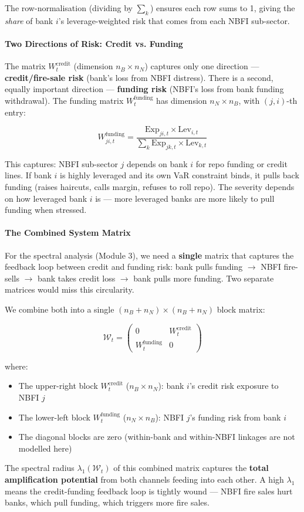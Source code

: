 \documentclass[11pt,a4paper]{article}
\begin{document}
The row-normalisation (dividing by $\sum_k$) ensures each row sums to 1, giving the \textit{share} of bank $i$'s leverage-weighted risk that comes from each NBFI sub-sector.


\paragraph{Two Directions of Risk: Credit vs. Funding}

The matrix $W_t^{\text{credit}}$ (dimension $n_B \times n_N$) captures only one direction --- \textbf{credit/fire-sale risk} (bank's loss from NBFI distress). There is a second, equally important direction --- \textbf{funding risk} (NBFI's loss from bank funding withdrawal). The funding matrix $W_t^{\text{funding}}$ has dimension $n_N \times n_B$, with $(j,i)$-th entry:

\[W_{ji,t}^{\text{funding}} = \frac{\text{Exp}_{ji,t} \times \text{Lev}_{i,t}}{\sum_k \text{Exp}_{jk,t} \times \text{Lev}_{k,t}}\]

This captures: NBFI sub-sector $j$ depends on bank $i$ for repo funding or credit lines. If bank $i$ is highly leveraged and its own VaR constraint binds, it pulls back funding (raises haircuts, calls margin, refuses to roll repo). The severity depends on how leveraged bank $i$ is --- more leveraged banks are more likely to pull funding when stressed.


\paragraph{The Combined System Matrix}

For the spectral analysis (Module 3), we need a \textbf{single} matrix that captures the feedback loop between credit and funding risk: bank pulls funding $\rightarrow$ NBFI fire-sells $\rightarrow$ bank takes credit loss $\rightarrow$ bank pulls more funding. Two separate matrices would miss this circularity.

We combine both into a single $(n_B + n_N) \times (n_B + n_N)$ block matrix:

\[\mathcal{W}_t = \begin{pmatrix} 0 & W_t^{\text{credit}} \\ W_t^{\text{funding}} & 0 \end{pmatrix}\]

where:
\begin{itemize}
\item The upper-right block $W_t^{\text{credit}}$ ($n_B \times n_N$): bank $i$'s credit risk exposure to NBFI $j$
\item The lower-left block $W_t^{\text{funding}}$ ($n_N \times n_B$): NBFI $j$'s funding risk from bank $i$
\item The diagonal blocks are zero (within-bank and within-NBFI linkages are not modelled here)

\end{itemize}
The spectral radius $\lambda_1(\mathcal{W}_t)$ of this combined matrix captures the \textbf{total amplification potential} from both channels feeding into each other. A high $\lambda_1$ means the credit-funding feedback loop is tightly wound --- NBFI fire sales hurt banks, which pull funding, which triggers more fire sales.
\end{document}
